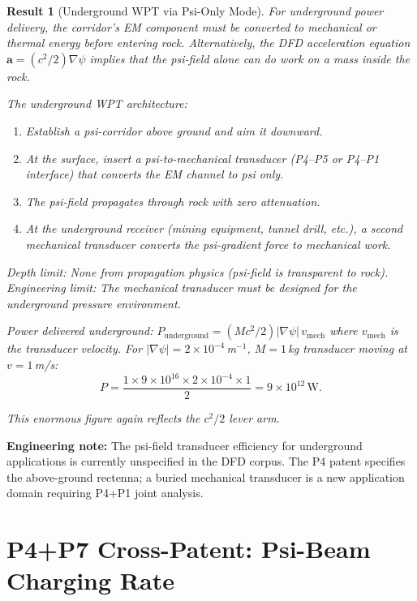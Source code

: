 \documentclass[aps,prd,twocolumn,superscriptaddress]{revtex4-2}
\newtheorem{result}{Result}
\begin{document}
\begin{result}[Underground WPT via Psi-Only Mode]
For underground power delivery, the corridor's EM component must be
\emph{converted to mechanical or thermal energy before entering rock}.
Alternatively, the DFD acceleration equation
$\mathbf{a} = (c^2/2)\nabla\psi$ implies that the psi-field alone
can do work on a mass inside the rock.

The underground WPT architecture:
\begin{enumerate}
\item Establish a psi-corridor above ground and aim it downward.
\item At the surface, insert a psi-to-mechanical transducer
  (P4--P5 or P4--P1 interface) that converts the EM channel to psi only.
\item The psi-field propagates through rock with zero attenuation.
\item At the underground receiver (mining equipment, tunnel drill, etc.),
  a second mechanical transducer converts the psi-gradient force
  to mechanical work.
\end{enumerate}

Depth limit: None from propagation physics (psi-field is transparent
to rock).  Engineering limit: The mechanical transducer must be designed
for the underground pressure environment.

Power delivered underground:
$P_\mathrm{underground} = (Mc^2/2)|\nabla\psi|\,v_\mathrm{mech}$
where $v_\mathrm{mech}$ is the transducer velocity.  For
$|\nabla\psi| = 2\times10^{-4}$\,m$^{-1}$, $M = 1$\,kg transducer
moving at $v = 1$\,m/s:
\begin{equation}
P = \frac{1\times9\times10^{16}\times2\times10^{-4}\times1}{2} = 9\times10^{12}\,\mathrm{W}.
\label{eq:P_underground}
\end{equation}

This enormous figure again reflects the $c^2/2$ lever arm.
\end{result}

\textbf{Engineering note:} The psi-field transducer efficiency for
underground applications is currently unspecified in the DFD corpus.
The P4 patent specifies the above-ground rectenna; a buried mechanical
transducer is a new application domain requiring P4+P1 joint analysis.

\section{P4+P7 Cross-Patent: Psi-Beam Charging Rate}
\label{sec:P4_P7_charging}
\end{document}
